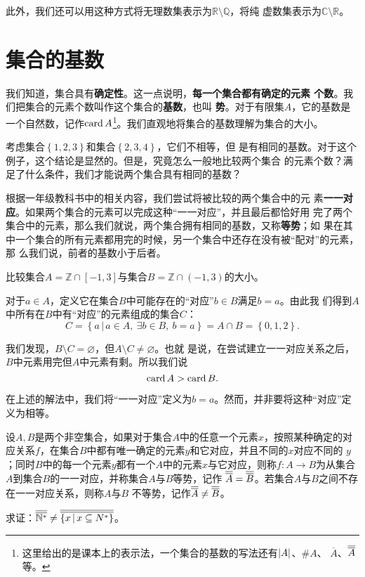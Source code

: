 此外，我们还可以用这种方式将无理数集表示为$\mathbb{R}\setminus\mathbb{Q}$，将纯
虚数集表示为$\mathbb{C}\setminus\mathbb{R}$。

\section{集合的基数}

我们知道，集合具有\textbf{确定性}。这一点说明，\textbf{每一个集合都有确定的元素
个数}。我们把集合的元素个数叫作这个集合的\textbf{基数}，也叫
\textbf{势}。对于有限集$A$，它的基数是一个自然数，记作$\operatorname{card}{A}
$\footnote{这里给出的是课本上的表示法，一个集合的基数的写法还有$\left|{A}\right|$、$\# A$、
$\overline{A}$、$\overline{\overline{{A}}}$等。}。我们直观地将集合的基数理解为集合的大小。

考虑集合$\left\{ 1,2,3 \right\} $和集合$\left\{ 2,3,4 \right\} $，它们不相等，但
是有相同的基数。对于这个例子，这个结论是显然的。但是，究竟怎么一般地比较两个集合
的元素个数？满足了什么条件，我们才能说两个集合具有相同的基数？

根据一年级教科书中的相关内容\cite{pep_math_1A}，我们尝试将被比较的两个集合中的元
素\textbf{一一对应}。如果两个集合的元素可以完成这种“一一对应”，并且最后都恰好用
完了两个集合中的元素，那么我们就说，两个集合拥有相同的基数，又称\textbf{等势}；如
果在其中一个集合的所有元素都用完的时候，另一个集合中还存在没有被“配对”的元素，那
么我们说，前者的基数小于后者。

\begin{rawexp}
    比较集合$A=\mathbb{Z}\cap \left[ -1,3 \right]$与集合$B=\mathbb{Z}\cap \left( 
    -1,3\right)$的大小。
\end{rawexp}

\begin{rawsol}
    对于$a \in A$，定义它在集合$B$中可能存在的“对应”$b \in B$满足$b = a$。由此我
    们得到$A$中所有在$B$中有“对应”的元素组成的集合$C$：
    \[
        C = \left\{a\,|\,a\in A,\ \exists b\in B,\ b=a\right\} = A\cap B = 
        \left\{ 0,1,2 \right\} .
    \]

    我们发现，$B\setminus C=\varnothing$，但$A\setminus C\neq\varnothing$。也就
    是说，在尝试建立一一对应关系之后，$B$中元素用完但$A$中元素有剩。所以我们说
    \[
        \operatorname{card}{A} > \operatorname{card}{B}.
    \]
\end{rawsol}

在上述的解法中，我们将“一一对应”定义为$b=a$。然而，并非要将这种“对应”定义为相等。

\begin{rawexp}[2024年台州二模T19节选]
    设$A,B$是两个非空集合，如果对于集合$A$中的任意一个元素$x$，按照某种确定的对
    应关系$f$，在集合$B$中都有唯一确定的元素$y$和它对应，并且不同的$x$对应不同的
    $y$；同时$B$中的每一个元素$y$都有一个$A$中的元素$x$与它对应，则称$f:
    A\rightarrow B$为从集合$A$到集合$B$的一一对应，并称集合$A$与$B$等势，记作
    $\overline{\overline{{A}}}=\overline{\overline{{B}}}$。若集合$A$与$B$之间不存在一一对应关系，则称$A$与$B$
    不等势，记作$\overline{\overline{{A}}}\neq\overline{\overline{{B}}}$。

    \vspace{1ex}
    求证：$\overline{\overline{{\mathbb{N}^\ast}}} \neq \overline{\overline{{\left\{ x\,|\, x\subseteq N^\ast 
    \right\}}}} $。
\end{rawexp}

